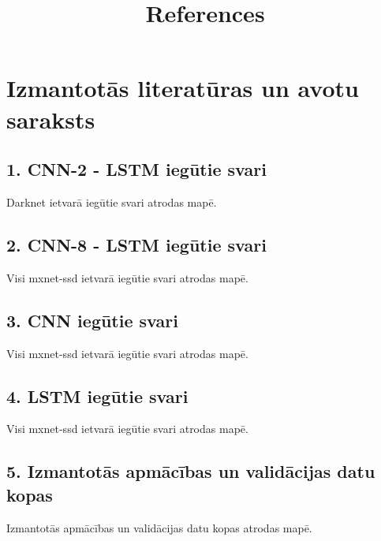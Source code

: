 \documentclass[12pt,paper=A4]{report}
\newcounter{nofappendices}
\begin{document}
    
    \chapter*{Izmantotās literatūras un avotu saraksts}
    
    \title{References}
    \begingroup
       \def\chapter*#1{}
    
    
    \endgroup
    
\appendix
\chapter*{Pielikumi}

\section*{1. CNN-2 - LSTM iegūtie svari}
\addtocounter{nofappendices}{1}
Darknet ietvarā iegūtie svari atrodas  mapē.

\section*{2. CNN-8 - LSTM iegūtie svari}
\addtocounter{nofappendices}{1}
Visi mxnet-ssd ietvarā iegūtie svari atrodas  mapē.

\section*{3. CNN iegūtie svari}
\addtocounter{nofappendices}{1}
Visi mxnet-ssd ietvarā iegūtie svari atrodas  mapē.

\section*{4. LSTM iegūtie svari}
\addtocounter{nofappendices}{1}
Visi mxnet-ssd ietvarā iegūtie svari atrodas  mapē.

\section*{5. Izmantotās apmācības un validācijas datu kopas}
\addtocounter{nofappendices}{1}
Izmantotās apmācības un validācijas datu kopas atrodas  mapē.
\end{document}
